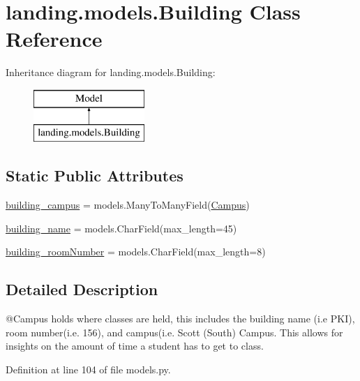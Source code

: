 \hypertarget{classlanding_1_1models_1_1Building}{}\section{landing.\+models.\+Building Class Reference}
\label{classlanding_1_1models_1_1Building}
Inheritance diagram for landing.\+models.\+Building\+:\begin{figure}[H]
\begin{center}
\leavevmode
\includegraphics[height=2.000000cm]{classlanding_1_1models_1_1Building}
\end{center}
\end{figure}
\subsection*{Static Public Attributes}
\begin{DoxyCompactItemize}
\item 
\mbox{\hyperlink{classlanding_1_1models_1_1Building_abc0975a9fc05e581cdd3c386da7c0ab0}{building\+\_\+campus}} = models.\+Many\+To\+Many\+Field(\mbox{\hyperlink{classlanding_1_1models_1_1Campus}{Campus}})
\item 
\mbox{\hyperlink{classlanding_1_1models_1_1Building_aae60127da595f83f0284ebb34d566791}{building\+\_\+name}} = models.\+Char\+Field(max\+\_\+length=45)
\item 
\mbox{\hyperlink{classlanding_1_1models_1_1Building_a9a8dc99b835d9bf509d7eb35660ecfb0}{building\+\_\+room\+Number}} = models.\+Char\+Field(max\+\_\+length=8)
\end{DoxyCompactItemize}


\subsection{Detailed Description}
\begin{DoxyVerb}@Campus holds where classes are held, this includes the
        building name (i.e PKI), room number(i.e. 156), and campus(i.e. Scott (South) Campus.
        This allows for insights on the amount of time a student has to get to class.
\end{DoxyVerb}
 

Definition at line 104 of file models.\+py.



